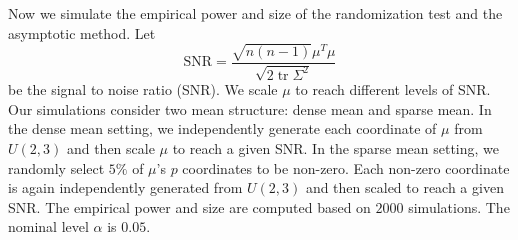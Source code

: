 \documentclass[3p]{elsarticle}
\DeclareMathOperator{\mytr}{tr}
\theoremstyle{plain}
\theoremstyle{definition}
\theoremstyle{remark}
\begin{document}
%
%




Now we simulate the empirical power and size of the randomization test and the asymptotic method.
Let 
\begin{equation*}
    \mathrm{SNR}=\frac{\sqrt{n(n-1)}\mu^T \mu}{\sqrt{2\mytr \Sigma^2}}
\end{equation*}
be the signal to noise ratio (SNR).
We scale $\mu$ to reach different levels of SNR\@.
Our simulations consider two mean structure: dense mean and sparse mean.
In the dense mean setting,  we independently generate each coordinate of $\mu$ from $U(2,3)$ and then scale $\mu$ to reach a given SNR\@.
In the sparse mean setting, we randomly select $5\%$ of $\mu$'s $p$ coordinates to be non-zero.
Each non-zero coordinate is again independently generated from $U(2,3)$ and then scaled to reach a given SNR\@.
The empirical power and size are computed based on $2000$ simulations.
The nominal level $\alpha$ is $0.05$.
\end{document}
